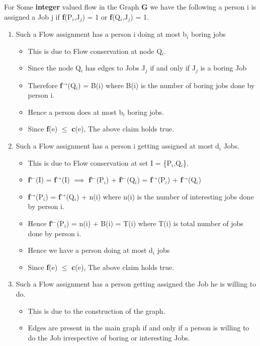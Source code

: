 \documentclass{report}
\begin{document}
 For Some \textbf{integer} valued flow in the Graph \textbf{G} we have the following a person i is assigned a Job j if \textbf{f}(P$_i$,J$_j$) = 1 or \textbf{f}(Q$_i$,J$_j$) = 1.
 \begin{enumerate}
     \item Such a Flow assignment has a person i doing at most b$_i$ boring jobs
     \begin{itemize}
         \item This is due to Flow conservation at node Q$_i$.
         \item Since the node Q$_i$ has edges to Jobs J$_j$ if and only if J$_j$ is a boring Job
         \item Therefore \textbf{f}$^\rightarrow$(Q$_i$) = B(i) where B(i) is the number of boring jobs done by person i.
         \item Hence a person does at most b$_i$ boring jobs.
         \item Since \textbf{f}(e) $\leq$ \textbf{c}(e), The above claim holds true.
     \end{itemize}
     \item Such a Flow assignment has a person i getting assigned at most d$_i$ Jobs.
     \begin{itemize}
         \item This is due to Flow conservation at set I = \{P$_i$,Q$_i$\}.
         \item \textbf{f}$^\gets$(I) = \textbf{f}$^\rightarrow$(I) $\implies$ \textbf{f}$^\gets$(P$_i$) + \textbf{f}$^\gets$(Q$_i$) = \textbf{f}$^\rightarrow$(P$_i$) + \textbf{f}$^\rightarrow$(Q$_i$)
         \item \textbf{f}$^\rightarrow$(P$_i$) = \textbf{f}$^\rightarrow$(Q$_i$) + n(i) where n(i) is the number of interesting jobs done by person i.
         \item Hence \textbf{f}$^\gets$(P$_i$) = n(i) + B(i) = T(i) where T(i) is total number of jobs done by person i.
         \item Hence we have a person doing at most d$_i$ jobs
         \item Since \textbf{f}(e) $\leq$ \textbf{c}(e), The above claim holds true.
     \end{itemize}
     \item Such a Flow assignment has a person getting assigned the Job he is willing to do.
     \begin{itemize}
         \item This is due to the construction of the graph.
         \item Edges are present in the main graph if and only if a person is willing to do the Job irrespective of boring or interesting Jobs.

\end{itemize}
\end{enumerate}
\end{document}
